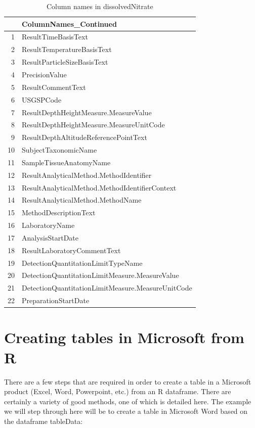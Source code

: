 \documentclass[a4paper,11pt]{article}\usepackage[]{graphicx}\usepackage[]{color}
\begin{document}
\begin{table}[ht]
\centering
\begin{tabular}{rl}
  \hline
 & ColumnNames\_Continued \\ 
  \hline
1 & ResultTimeBasisText \\ 
  2 & ResultTemperatureBasisText \\ 
  3 & ResultParticleSizeBasisText \\ 
  4 & PrecisionValue \\ 
  5 & ResultCommentText \\ 
  6 & USGSPCode \\ 
  7 & ResultDepthHeightMeasure.MeasureValue \\ 
  8 & ResultDepthHeightMeasure.MeasureUnitCode \\ 
  9 & ResultDepthAltitudeReferencePointText \\ 
  10 & SubjectTaxonomicName \\ 
  11 & SampleTissueAnatomyName \\ 
  12 & ResultAnalyticalMethod.MethodIdentifier \\ 
  13 & ResultAnalyticalMethod.MethodIdentifierContext \\ 
  14 & ResultAnalyticalMethod.MethodName \\ 
  15 & MethodDescriptionText \\ 
  16 & LaboratoryName \\ 
  17 & AnalysisStartDate \\ 
  18 & ResultLaboratoryCommentText \\ 
  19 & DetectionQuantitationLimitTypeName \\ 
  20 & DetectionQuantitationLimitMeasure.MeasureValue \\ 
  21 & DetectionQuantitationLimitMeasure.MeasureUnitCode \\ 
  22 & PreparationStartDate \\ 
   \hline
\end{tabular}
\caption{Column names in dissolvedNitrate} 
\end{table}



\clearpage

\section{Creating tables in Microsoft from R}
\label{app:createWordTable}
There are a few steps that are required in order to create a table in a Microsoft product (Excel, Word, Powerpoint, etc.) from an R dataframe. There are certainly a variety of good methods, one of which is detailed here. The example we will step through here will be to create a table in Microsoft Word based on the dataframe tableData:
\end{document}
